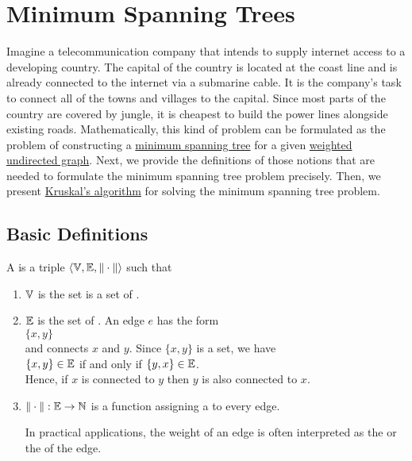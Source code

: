 \section{Minimum Spanning Trees}
Imagine a telecommunication company that intends to supply internet access to a developing country.
The capital of the country is located at the coast line and is already connected to the internet via
a submarine cable. It is the company's task to connect all of the towns and villages to the capital.
Since most parts of the country are covered by jungle, it is cheapest to build the power lines
alongside existing roads.  Mathematically, this kind of problem can be formulated as the problem of
constructing a \href{https://en.wikipedia.org/wiki/Minimum_spanning_tree}{minimum spanning tree} for
a given \href{https://en.wikipedia.org/wiki/Graph_(discrete_mathematics)#Weighted_graph}{weighted}
\href{https://en.wikipedia.org/wiki/Graph_(discrete_mathematics)#Undirected_graph}{undirected graph}.
Next, we provide the definitions of those notions that are needed to formulate the minimum spanning
tree problem precisely.  Then, we present
\href{https://en.wikipedia.org/wiki/Kruskal%27s_algorithm}{Kruskal's algorithm} for solving the
minimum spanning tree problem. 

\subsection{Basic Definitions}
\begin{Definition} A  is a triple 
   $\langle {\mathbb V}, {\mathbb E}, \|\cdot\| \rangle$ such that
  \begin{enumerate}
  \item ${\mathbb V}$ is the set is a set of  .
  \item ${\mathbb E}$ is the set of  .  An edge $e$ has the form
        \\[0.2cm]
        \hspace*{1.3cm}
        $\{x, y\}$
        \\[0.2cm]
        and connects $x$ and $y$.  Since $\{x,y\}$ is a set, we have
        \\[0.2cm]
        \hspace*{1.3cm}
        $\{x,y\} \in {\mathbb E}$ \quad if and only if $\{y,x\} \in {\mathbb E}$.
        \\[0.2cm]
        Hence, if $x$ is connected to $y$ then $y$ is also connected to $x$.
  \item $\|\cdot\|: {\mathbb E} \rightarrow {\mathbb N}$ is a function assigning a  to every edge.

        In practical applications, the weight of an edge is often interpreted as the  or the
         of the edge.
        \conclude
  \end{enumerate}
\end{Definition}

